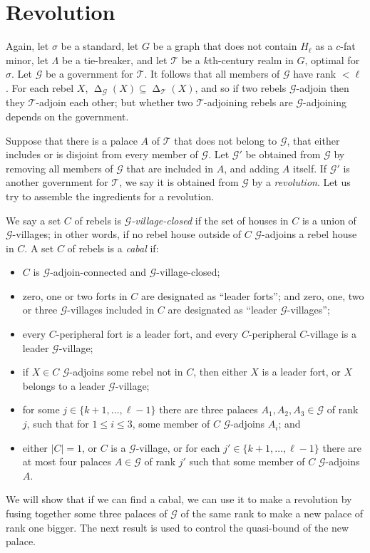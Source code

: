 \documentclass[titlepage,11pt]{article}
\def\LL{,\ldots,}
\newcommand{\voro}{\operatorname{\Delta}}
\newcommand{\mac}{\mathcal}
\begin{document}
	\section{Revolution}
	
	Again, let $\sigma$ be a standard, let $G$ be a graph that does not contain $H_{\ell}$ as a $c$-fat minor, let $\Lambda$ be a tie-breaker, and let
	$\mathcal{T}$ be a $k$th-century realm in $G$, optimal for $\sigma$.
	Let $\mac G$ be a government
	for $\mac T$. It follows that all members of $\mac G$ have rank $<\ell$. 
	For each rebel $X$, $\voro_{\mac G}(X)\subseteq \voro_{\mac T}(X)$,
	and so if two rebels $\mac G$-adjoin then they $\mac T$-adjoin each other; but whether two $\mac T$-adjoining rebels are $\mac G$-adjoining depends on the government.
	
	Suppose that there is a palace $A$ of $\mac T$ that does not belong to $\mac G$, that either includes or is disjoint from every member of $\mac G$. 
	Let $\mac G'$ be obtained from $\mac G$ by removing all members of $\mac G$ that are included in $A$, and adding $A$ itself. If $\mac G'$ is another government
	for $\mac T$, we say it is obtained from $\mac G$ by a {\em revolution}. Let us try to assemble the ingredients for a revolution.
	
	
	
	
	
	We say a set $C$ of rebels is {\em $\mac G$-village-closed} if the set of houses in $C$ is a union of $\mac G$-villages; in other words, if no rebel house outside of $C$ $\mac G$-adjoins a rebel house in $C$.
	A set $C$ of rebels is a {\em cabal} if:
	\begin{itemize}
		\item $C$ is $\mac G$-adjoin-connected and $\mac G$-village-closed;
		\item zero, one or two forts in $C$ are designated as ``leader forts''; and zero, one, two or three $\mac G$-villages included in $C$ are designated as
		``leader $\mac G$-villages'';
		\item every $C$-peripheral fort is a leader fort, and every $C$-peripheral $C$-village is a leader $\mac G$-village;
		\item if $X\in C$ $\mac G$-adjoins some rebel not in $C$, then either $X$ is a leader fort, or $X$ belongs to a leader $\mac G$-village;
		\item for some $j\in \{k+1\LL \ell-1\}$ there are three palaces $A_1,A_2,A_3\in \mac G$ of rank $j$, such that for $1\le i\le 3$,
		some member of $C$ $\mac G$-adjoins $A_i$; and
		\item either $|C|=1$, or $C$ is a $\mac G$-village, or for each $j'\in \{k+1\LL \ell-1\}$ there are at most four palaces $A\in \mac G$ of rank $j'$ such that
		some member of $C$ $\mac G$-adjoins $A$.
	\end{itemize}
	We will show that if we can find a cabal, we can use it to make a revolution by fusing together some three palaces of $\mac G$
	of the same rank to make a new palace of rank one bigger. The next result is used to control the quasi-bound of the new palace.
	
\end{document}
